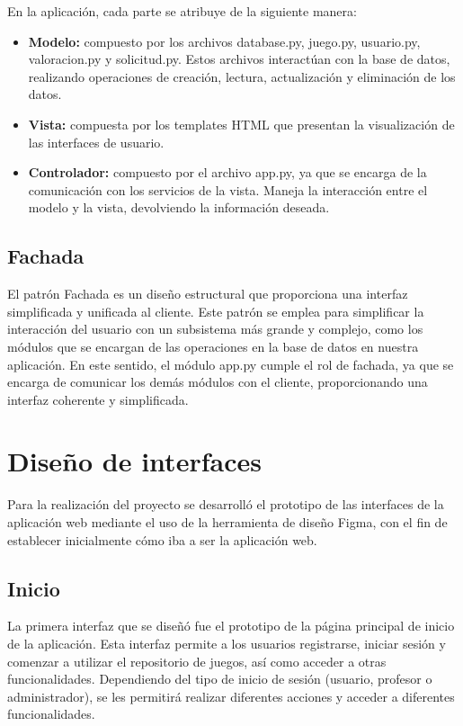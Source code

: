En la aplicación, cada parte se atribuye de la siguiente manera:
\begin{itemize}
    \item\textbf{Modelo:} compuesto por los archivos database.py, juego.py, usuario.py, valoracion.py y solicitud.py. Estos archivos interactúan con la base de datos, realizando operaciones de creación, lectura, actualización y eliminación de los datos.
    \item\textbf{Vista:} compuesta por los templates HTML que presentan la visualización de las interfaces de usuario.
    \item\textbf{Controlador:} compuesto por el archivo app.py, ya que se encarga de la comunicación con los servicios de la vista. Maneja la interacción entre el modelo y la vista, devolviendo la información deseada.
\end{itemize}

\subsection{Fachada}
El patrón Fachada es un diseño estructural que proporciona una interfaz simplificada y unificada al cliente. Este patrón se emplea para simplificar la interacción del usuario con un subsistema más grande y complejo, como los módulos que se encargan de las operaciones en la base de datos en nuestra aplicación. En este sentido, el módulo app.py cumple el rol de fachada, ya que se encarga de comunicar los demás módulos con el cliente, proporcionando una interfaz coherente y simplificada.


\section{Diseño de interfaces}
Para la realización del proyecto se desarrolló el prototipo de las interfaces de la aplicación web mediante el uso de la herramienta de diseño Figma, con el fin de establecer inicialmente cómo iba a ser la aplicación web.

\subsection{Inicio}
La primera interfaz que se diseñó fue el prototipo de la página principal de inicio de la aplicación. Esta interfaz permite a los usuarios registrarse, iniciar sesión y comenzar a utilizar el repositorio de juegos, así como acceder a otras funcionalidades. Dependiendo del tipo de inicio de sesión (usuario, profesor o administrador), se les permitirá realizar diferentes acciones y acceder a diferentes funcionalidades.

